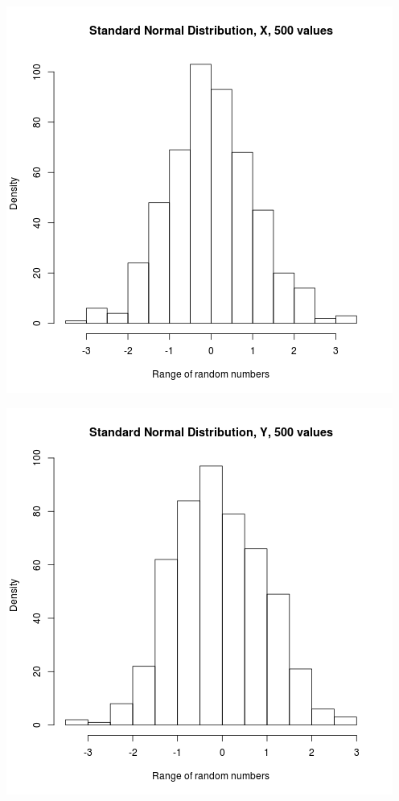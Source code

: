 \documentclass{article}
\begin{document}
\includegraphics{"plot2_2_X"}
\pagebreak

\includegraphics{"plot2_2_Y"}
\pagebreak
\end{document}
